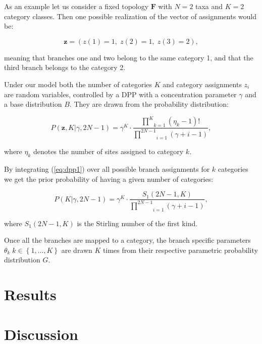 As an example let us consider a fixed topology $\mathbf{F}$ with $N=2$ taxa and $K=2$ category classes.
Then one possible realization of the vector of assignments would be:

$$\mathbf{z}=\left(z(1)=1,\; z(2)=1,\; z(3)=2\right),$$
 
\noindent
meaning that branches one and two belong to the same category 1, and that the third branch belongs to the category 2.

Under our model both the number of categories $K$ and category assignments $z_{i}$ are random variables, controlled by a DPP with a concentration parameter $\gamma$ and a base distribution $B$.
They are drawn from the probability distribution:

\begin{equation}
P(\mathbf{z},K|\gamma,2N-1)=\gamma^{K}\cdot\frac{\underset{k=1}{\overset{K}{\prod}}\left(\eta_{k}-1\right)!}{\underset{i=1}{\overset{2N-1}{\prod}}\left(\gamma+i-1\right)},
\label{eq:dpp1} 
\end{equation} 
 
\noindent 
where $\eta_{k}$ denotes the number of sites assigned to category $k$.

By integrating (\ref{eq:dpp1}) over all possible branch assignments for $k$ categories we get the prior probability of having a given number of categories:

\begin{equation}
P(K|\gamma,2N-1)=\gamma^{K}\cdot\frac{S_{1}(2N-1,K)}{\underset{i=1}{\overset{2N-1}{\prod}}\left(\gamma+i-1\right)},
\label{eq:dpp2} 
\end{equation} 

\noindent
where $S_{1}(2N-1,K)$ is the Stirling number of the first kind. 


Once all the branches are mapped to a category, the branch specific parameters $\theta_{k}\; k\in\left\{ 1,\ldots,K\right\}$ are drawn $K$ times from their respective parametric probability distribution $G$.



\section{Results}




\section{Discussion}



